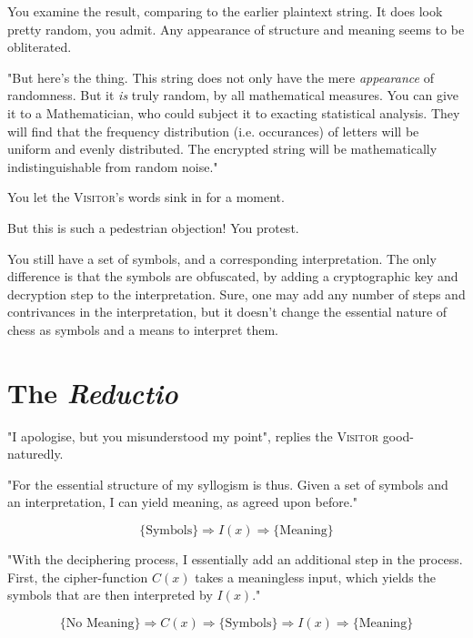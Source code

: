 You examine the result, comparing to the earlier plaintext string. It does look pretty random, you admit. Any appearance of structure and meaning seems to be obliterated.

"But here's the thing. This string does not only have the mere \emph{appearance} of randomness. But it \emph{is} truly random, by all mathematical measures. You can give it to a Mathematician, who could subject it to exacting statistical analysis. They will find that the frequency distribution (i.e. occurances) of letters will be uniform and evenly distributed. The encrypted string will be mathematically indistinguishable from random noise."

You let the \textsc{Visitor}'s words sink in for a moment.

But this is such a pedestrian objection! You protest.

You still have a set of symbols, and a corresponding interpretation. The only difference is that the symbols are obfuscated, by adding a cryptographic key and decryption step to the interpretation. Sure, one may add any number of steps and contrivances in the interpretation, but it doesn't change the essential nature of chess as symbols and a means to interpret them.

\section{The \emph{Reductio}}

"I apologise, but you misunderstood my point", replies the \textsc{Visitor} good-naturedly.

"For the essential structure of my syllogism is thus. Given a set of symbols and an interpretation, I can yield meaning, as agreed upon before."

\begin{equation*}
  \{\text{Symbols}\} \Rightarrow I(x) \Rightarrow \{\text{Meaning}\}
\end{equation*}

"With the deciphering process, I essentially add an additional step in the process. First, the cipher-function $C(x)$ takes a meaningless input, which yields the symbols that are then interpreted by $I(x)$."

\begin{equation*}
  \{\text{No Meaning}\} \Rightarrow C(x) \Rightarrow \{\text{Symbols}\} \Rightarrow I(x) \Rightarrow \{\text{Meaning}\}
\end{equation*}


